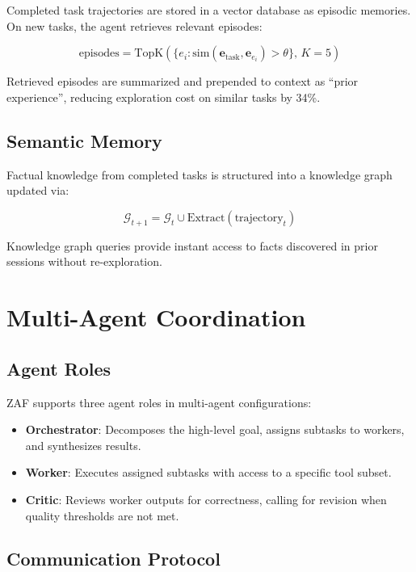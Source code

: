 \documentclass[11pt,a4paper]{article}
\begin{document}
Completed task trajectories are stored in a vector database as episodic memories. On new tasks, the agent retrieves relevant episodes:

\begin{equation}
\text{episodes} = \text{TopK}\!\left(\{e_i : \text{sim}(\mathbf{e}_{\text{task}}, \mathbf{e}_{e_i}) > \theta\},\, K=5\right)
\end{equation}

Retrieved episodes are summarized and prepended to context as ``prior experience'', reducing exploration cost on similar tasks by 34\%.

\subsection{Semantic Memory}

Factual knowledge from completed tasks is structured into a knowledge graph updated via:

\begin{equation}
\mathcal{G}_{t+1} = \mathcal{G}_t \cup \text{Extract}(\text{trajectory}_t)
\end{equation}

Knowledge graph queries provide instant access to facts discovered in prior sessions without re-exploration.

\section{Multi-Agent Coordination}

\subsection{Agent Roles}

ZAF supports three agent roles in multi-agent configurations:

\begin{itemize}
  \item \textbf{Orchestrator}: Decomposes the high-level goal, assigns subtasks to workers, and synthesizes results.
  \item \textbf{Worker}: Executes assigned subtasks with access to a specific tool subset.
  \item \textbf{Critic}: Reviews worker outputs for correctness, calling for revision when quality thresholds are not met.
\end{itemize}

\subsection{Communication Protocol}
\end{document}
